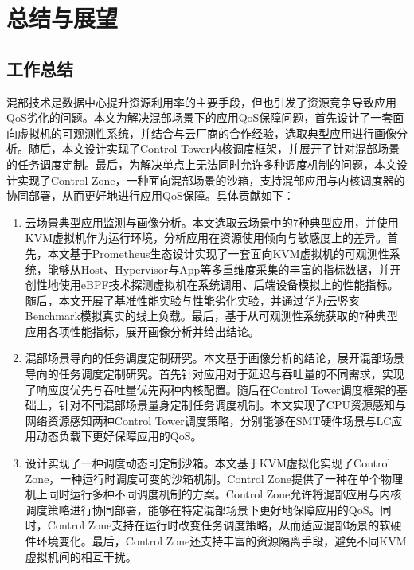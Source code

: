 \chapter{总结与展望}\label{chap:theories_tech}

\section{工作总结}

混部技术是数据中心提升资源利用率的主要手段，但也引发了资源竞争导致应用QoS劣化的问题。本文为解决混部场景下的应用QoS保障问题，首先设计了一套面向虚拟机的可观测性系统，并结合与云厂商的合作经验，选取典型应用进行画像分析。随后，本文设计实现了Control Tower内核调度框架，并展开了针对混部场景的任务调度定制。最后，为解决单点上无法同时允许多种调度机制的问题，本文设计实现了Control Zone，一种面向混部场景的沙箱，支持混部应用与内核调度器的协同部署，从而更好地进行应用QoS保障。具体贡献如下：

\begin{enumerate}
    \item 云场景典型应用监测与画像分析。本文选取云场景中的7种典型应用，并使用KVM虚拟机作为运行环境，分析应用在资源使用倾向与敏感度上的差异。首先，本文基于Prometheus生态设计实现了一套面向KVM虚拟机的可观测性系统，能够从Host、Hypervisor与App等多重维度采集的丰富的指标数据，并开创性地使用eBPF技术探测虚拟机在系统调用、后端设备模拟上的性能指标。随后，本文开展了基准性能实验与性能劣化实验，并通过华为云竖亥Benchmark模拟真实的线上负载。最后，基于从可观测性系统获取的7种典型应用各项性能指标，展开画像分析并给出结论。

    \item 混部场景导向的任务调度定制研究。本文基于画像分析的结论，展开混部场景导向的任务调度定制研究。首先针对应用对于延迟与吞吐量的不同需求，实现了响应度优先与吞吐量优先两种内核配置。随后在Control Tower调度框架的基础上，针对不同混部场景量身定制任务调度机制。本文实现了CPU资源感知与网络资源感知两种Control Tower调度策略，分别能够在SMT硬件场景与LC应用动态负载下更好保障应用的QoS。

    \item 设计实现了一种调度动态可定制沙箱。本文基于KVM虚拟化实现了Control Zone，一种运行时调度可变的沙箱机制。Control Zone提供了一种在单个物理机上同时运行多种不同调度机制的方案。Control Zone允许将混部应用与内核调度策略进行协同部署，能够在特定混部场景下更好地保障应用的QoS。同时，Control Zone支持在运行时改变任务调度策略，从而适应混部场景的软硬件环境变化。最后，Control Zone还支持丰富的资源隔离手段，避免不同KVM虚拟机间的相互干扰。

\end{enumerate}

